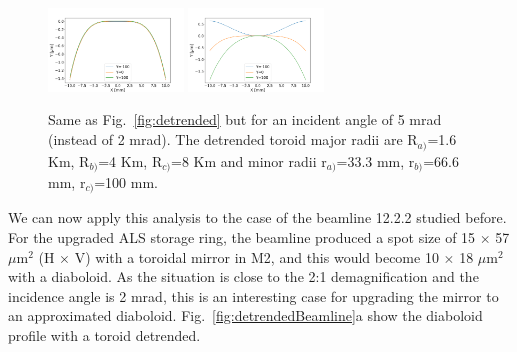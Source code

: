\documentclass{iucr}              %
\begin{document}
\begin{figure}
\includegraphics[width=0.32\textwidth]{figures/diaboloid_detrended_5mrad_1:2_profile.png}
\includegraphics[width=0.32\textwidth]{figures/diaboloid_detrended_5mrad_1:1_profile.png}

\caption{
Same as Fig.~\ref{fig:detrended} but for an incident angle of 5 mrad (instead of 2 mrad). The detrended toroid major radii are R$_{a)}$=1.6 Km, R$_{b)}$=4 Km, R$_{c)}$=8 Km and minor radii r$_{a)}$=33.3 mm, r$_{b)}$=66.6 mm, r$_{c)}$=100 mm.
}
\end{figure}



We can now apply this analysis to the case of the beamline 12.2.2 studied before. For the upgraded ALS storage ring, the beamline produced a spot size of 15 $\times$ 57 $\mu$m$^2$ (H $\times$ V) with a toroidal mirror in M2, and this would become 10 $\times$ 18 $\mu$m$^2$ with a diaboloid. As the situation is close to the 2:1 demagnification and the incidence angle is 2 mrad, this is an interesting case for upgrading the mirror to an approximated diaboloid. Fig.~\ref{fig:detrendedBeamline}a show the diaboloid profile with a toroid detrended. 
\end{document}
